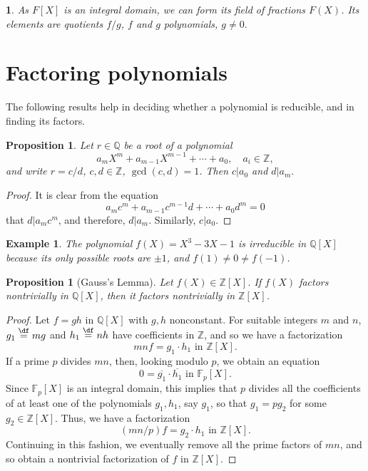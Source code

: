 \documentclass[a4paper,11pt,final,openany]{memoir}
\newtheorem{proposition}[X]{Proposition}
\newtheorem{example}[X]{Example}
\newtheorem{plain}[X]{}
\theoremstyle{nonumberplain}
\newtheorem{proof}{Proof.}
\begin{document}
\begin{plain}
\label{ef3f}As $F[X]$ is an integral domain, we can form its field of
fractions $F(X)$. Its elements are quotients $f/g$, $f$ and $g$ polynomials,
$g\neq0.$
\end{plain}

\section{Factoring polynomials}

The following results help in deciding whether a polynomial is reducible, and
in finding its factors.

\begin{proposition}
\label{ef4}Let $r\in\mathbb{Q}{}$ be a root of a polynomial
\[
a_{m}X^{m}+a_{m-1}X^{m-1}+\cdots+a_{0},\quad a_{i}\in\mathbb{Z},
\]
and write $r=c/d$, $c,d\in\mathbb{Z}$, $\gcd(c,d)=1$. Then $c|a_{0}$ and
$d|a_{m}.$
\end{proposition}

\begin{proof}
It is clear from the equation
\[
a_{m}c^{m}+a_{m-1}c^{m-1}d+\cdots+a_{0}d^{m}=0
\]
that $d|a_{m}c^{m}$, and therefore, $d|a_{m}.$ Similarly, $c|a_{0}$.
\end{proof}

\begin{example}
\label{ef5}The polynomial $f(X)=X^{3}-3X-1$ is irreducible in $\mathbb{Q}[X]$
because its only possible roots are $\pm1$, and $f(1)\neq0\neq f(-1)$.
\end{example}

\begin{proposition}
[Gauss's Lemma]\label{ef6}%
%
Let $f(X)\in\mathbb{Z}[X]$. If $f(X)$ factors nontrivially in $\mathbb{Q}[X]$,
then it factors nontrivially in $\mathbb{Z}{}[X]$.
\end{proposition}

\begin{proof}
Let $f=gh$ in $\mathbb{Q}{}[X]$ with $g,h$ nonconstant${}$. For suitable
integers $m$ and $n$, $g_{1}\overset{\df}{=}mg$ and
$h_{1}\overset{\df}{=}nh$ have coefficients in $\mathbb{Z}{}%
$, and so we have a factorization%
\[
mnf=g_{1}\cdot h_{1}\text{ in }\mathbb{Z}{}[X]\text{.}%
\]
If a prime $p$ divides $mn$, then, looking modulo $p$, we obtain an equation%
\[
0=\overline{g_{1}}\cdot\overline{h_{1}}\text{ in }\mathbb{F}{}_{p}[X]\text{.}%
\]
Since $\mathbb{F}_{p}[X]$ is an integral domain, this implies that $p$ divides
all the coefficients of at least one of the polynomials $g_{1},h_{1}$, say
$g_{1}$, so that $g_{1}=pg_{2}$ for some $g_{2}\in\mathbb{Z}[X]$. Thus, we
have a factorization%
\[
(mn/p)f=g_{2}\cdot h_{1}\text{ in }\mathbb{Z}{}[X]\text{.}%
\]
Continuing in this fashion, we eventually remove all the prime factors of
$mn$, and so obtain a nontrivial factorization of $f$ in $\mathbb{Z}{}[X]$.
\end{proof}
\end{document}
